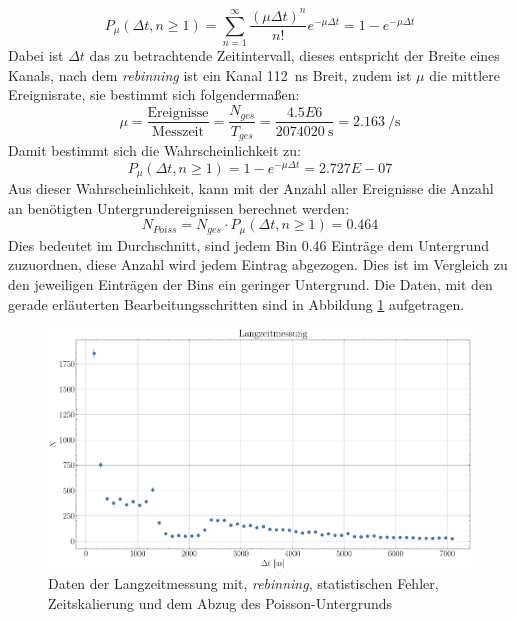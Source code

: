 \documentclass[12pt,a4paper,ngerman]{report}
\begin{document}
	\begin{equation}
		P_{\mu} (\Delta t, n  \geq 1) = \sum_{n = 1}^{\infty} \frac{(\mu \Delta t)^n}{n !} e^{-\mu \Delta t} = 1- e^{-\mu \Delta t}
	\end{equation}
	Dabei ist $\Delta t$ das zu betrachtende Zeitintervall, dieses entspricht der Breite eines Kanals, nach dem \textit{rebinning} ist ein Kanal \SI{112}{\nano \s} Breit, zudem ist $\mu$ die mittlere Ereignisrate, sie bestimmt sich folgendermaßen: 
	\begin{equation}
		\mu = \frac{\text{Ereignisse}}{\text{Messzeit}} = \frac{N_{ges}}{T_{ges}} = \frac{4.5E6}{\SI{2074020}{\second}} = \SI{2.163}{\per \second}
	\end{equation}
	Damit bestimmt sich die Wahrscheinlichkeit zu:
	\begin{equation}
			P_{\mu} (\Delta t, n  \geq 1) = 1- e^{-\mu \Delta t} = 2.727 E-07
	\end{equation}
	Aus dieser Wahrscheinlichkeit, kann mit der Anzahl aller Ereignisse die Anzahl an benötigten Untergrundereignissen berechnet werden:
	\begin{equation}
		N_{Poiss} = N_{ges} \cdot P_{\mu} (\Delta t, n  \geq 1) = 0.464
	\end{equation}
	Dies bedeutet im Durchschnitt, sind jedem Bin 0.46 Einträge dem Untergrund zuzuordnen, diese Anzahl wird jedem Eintrag abgezogen. Dies ist im Vergleich zu den jeweiligen Einträgen der Bins ein geringer Untergrund. Die Daten, mit den gerade erläuterten Bearbeitungsschritten sind in Abbildung \ref{img:langzeitMess} aufgetragen. \\
	\begin{figure}[ht]
		\centering
		\includegraphics[width=\textwidth]{Bilder/langzeitMess.pdf}		
		\caption[Langzeitmessung]{Daten der Langzeitmessung mit, \textit{rebinning}, statistischen Fehler, Zeitskalierung und dem Abzug des Poisson-Untergrunds}
		\label{img:langzeitMess}
	\end{figure}
\end{document}
